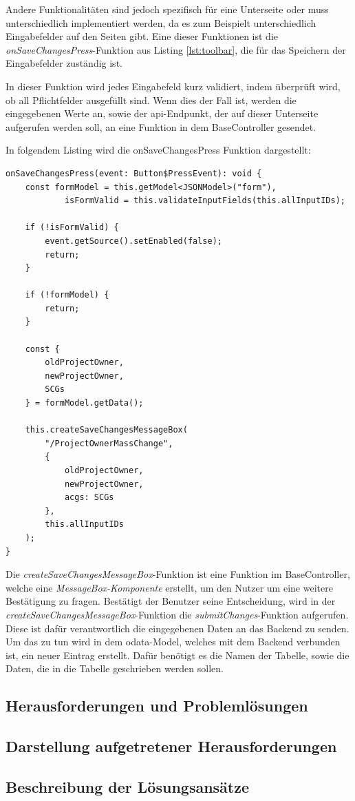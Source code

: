 Andere Funktionalitäten sind jedoch spezifisch für eine Unterseite oder muss unterschiedlich implementiert werden, da es zum Beispielt unterschiedlich Eingabefelder auf den Seiten gibt.
Eine dieser Funktionen ist die \textit{onSaveChangesPress}-Funktion aus Listing \ref{lst:toolbar}, die für das Speichern der Eingabefelder zuständig ist.

In dieser Funktion wird jedes Eingabefeld kurz validiert, indem überprüft wird, ob all Pflichtfelder ausgefüllt sind.
Wenn dies der Fall ist, werden die eingegebenen Werte an, sowie der \gls{api}-Endpunkt, der auf dieser Unterseite aufgerufen werden soll, an eine Funktion in dem BaseController gesendet.

In folgendem Listing wird die onSaveChangesPress Funktion dargestellt:
\begin{lstlisting}[caption={onSaveChangesPress Funktion}]
onSaveChangesPress(event: Button$PressEvent): void {
    const formModel = this.getModel<JSONModel>("form"),
            isFormValid = this.validateInputFields(this.allInputIDs);

    if (!isFormValid) {
        event.getSource().setEnabled(false);
        return;
    }

    if (!formModel) {
        return;
    }

    const {
        oldProjectOwner,
        newProjectOwner,
        SCGs
    } = formModel.getData();

    this.createSaveChangesMessageBox(
        "/ProjectOwnerMassChange", 
        {                
            oldProjectOwner,
            newProjectOwner,
            acgs: SCGs
        },
        this.allInputIDs
    );
}
\end{lstlisting}

Die \textit{createSaveChangesMessageBox}-Funktion ist eine Funktion im BaseController, welche eine \textit{MessageBox-Komponente} erstellt, um den Nutzer um eine weitere Bestätigung zu fragen.
Bestätigt der Benutzer seine Entscheidung, wird in der \textit{createSaveChangesMessageBox}-Funktion die \textit{submitChanges}-Funktion aufgerufen.
Diese ist dafür verantwortlich die eingegebenen Daten an das Backend zu senden.
Um das zu tun wird in dem \gls{odata}-Model, welches mit dem Backend verbunden ist, ein neuer Eintrag erstellt.
Dafür benötigt es die Namen der Tabelle, sowie die Daten, die in die Tabelle geschrieben werden sollen.



\subsection[Herausforderungen und Problemlösungen]{Herausforderungen und Problemlösungen}

\subsection[Darstellung aufgetretener Herausforderungen]{Darstellung aufgetretener Herausforderungen}

\subsection[Beschreibung der Lösungsansätze]{Beschreibung der Lösungsansätze}
